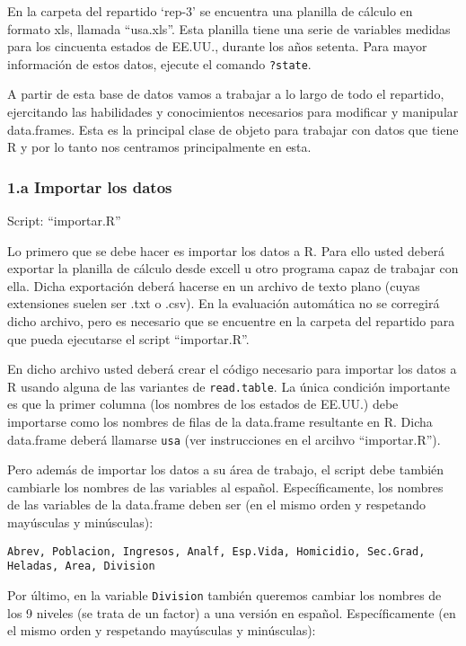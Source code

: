 \documentclass[]{article}
\begin{document}
En la carpeta del repartido `rep-3' se encuentra una planilla de cálculo
en formato xls, llamada ``usa.xls''. Esta planilla tiene una serie de
variables medidas para los cincuenta estados de EE.UU., durante los años
setenta. Para mayor información de estos datos, ejecute el comando
\texttt{?state}.

A partir de esta base de datos vamos a trabajar a lo largo de todo el
repartido, ejercitando las habilidades y conocimientos necesarios para
modificar y manipular data.frames. Esta es la principal clase de objeto
para trabajar con datos que tiene R y por lo tanto nos centramos
principalmente en esta.

\subsubsection{1.a Importar los datos}

Script: ``importar.R''

Lo primero que se debe hacer es importar los datos a R. Para ello usted
deberá exportar la planilla de cálculo desde excell u otro programa
capaz de trabajar con ella. Dicha exportación deberá hacerse en un
archivo de texto plano (cuyas extensiones suelen ser .txt o .csv). En la
evaluación automática no se corregirá dicho archivo, pero es necesario
que se encuentre en la carpeta del repartido para que pueda ejecutarse
el script ``importar.R''.

En dicho archivo usted deberá crear el código necesario para importar
los datos a R usando alguna de las variantes de \texttt{read.table}. La
única condición importante es que la primer columna (los nombres de los
estados de EE.UU.) debe importarse como los nombres de filas de la
data.frame resultante en R. Dicha data.frame deberá llamarse
\texttt{usa} (ver instrucciones en el arcihvo ``importar.R'').

Pero además de importar los datos a su área de trabajo, el script debe
también cambiarle los nombres de las variables al español.
Específicamente, los nombres de las variables de la data.frame deben ser
(en el mismo orden y respetando mayúsculas y minúsculas):

\begin{verbatim}
Abrev, Poblacion, Ingresos, Analf, Esp.Vida, Homicidio, Sec.Grad, 
Heladas, Area, Division
\end{verbatim}

Por último, en la variable \texttt{Division} también queremos cambiar
los nombres de los 9 niveles (se trata de un factor) a una versión en
español. Específicamente (en el mismo orden y respetando mayúsculas y
minúsculas):
\end{document}
